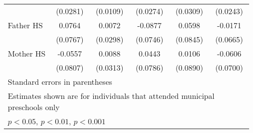 \begin{table}[htbp]
\begin{tabular}{l*{5}{c}}
            &    (0.0281)         &    (0.0109)         &    (0.0274)         &    (0.0309)         &    (0.0243)         \\
\addlinespace
Father HS   &      0.0764         &      0.0072         &     -0.0877         &      0.0598         &     -0.0171         \\
            &    (0.0767)         &    (0.0298)         &    (0.0746)         &    (0.0845)         &    (0.0665)         \\
\addlinespace
Mother HS   &     -0.0557         &      0.0088         &      0.0443         &      0.0106         &     -0.0606         \\
            &    (0.0807)         &    (0.0313)         &    (0.0786)         &    (0.0890)         &    (0.0700)         \\
\bottomrule
\multicolumn{6}{l}{\footnotesize Standard errors in parentheses}\\
\multicolumn{6}{l}{\footnotesize Estimates shown are for individuals that attended municipal preschools only}\\
\multicolumn{6}{l}{\footnotesize \sym{*} \(p<0.05\), \sym{**} \(p<0.01\), \sym{***} \(p<0.001\)}\\
\end{tabular}
\end{table}
